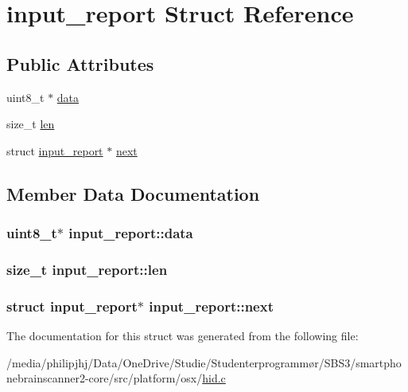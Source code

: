 \hypertarget{structinput__report}{\section{input\-\_\-report Struct Reference}
\label{structinput__report}
}
\subsection*{Public Attributes}
\begin{DoxyCompactItemize}
\item 
uint8\-\_\-t $\ast$ \hyperlink{structinput__report_ade8489c1a622bb5efc63e7a4509481d4}{data}
\item 
size\-\_\-t \hyperlink{structinput__report_adf7e672dafb01812c77752529c1217b7}{len}
\item 
struct \hyperlink{structinput__report}{input\-\_\-report} $\ast$ \hyperlink{structinput__report_acb221bd757603227febe8522c63b656b}{next}
\end{DoxyCompactItemize}


\subsection{Member Data Documentation}
\hypertarget{structinput__report_ade8489c1a622bb5efc63e7a4509481d4}{
\subsubsection[{data}]{\setlength{\rightskip}{0pt plus 5cm}uint8\-\_\-t$\ast$ input\-\_\-report\-::data}}\label{structinput__report_ade8489c1a622bb5efc63e7a4509481d4}
\hypertarget{structinput__report_adf7e672dafb01812c77752529c1217b7}{
\subsubsection[{len}]{\setlength{\rightskip}{0pt plus 5cm}size\-\_\-t input\-\_\-report\-::len}}\label{structinput__report_adf7e672dafb01812c77752529c1217b7}
\hypertarget{structinput__report_acb221bd757603227febe8522c63b656b}{
\subsubsection[{next}]{\setlength{\rightskip}{0pt plus 5cm}struct {\bf input\-\_\-report}$\ast$ input\-\_\-report\-::next}}\label{structinput__report_acb221bd757603227febe8522c63b656b}


The documentation for this struct was generated from the following file\-:\begin{DoxyCompactItemize}
\item 
/media/philipjhj/\-Data/\-One\-Drive/\-Studie/\-Studenterprogrammør/\-S\-B\-S3/smartphonebrainscanner2-\/core/src/platform/osx/\hyperlink{osx_2hid_8c}{hid.\-c}\end{DoxyCompactItemize}
